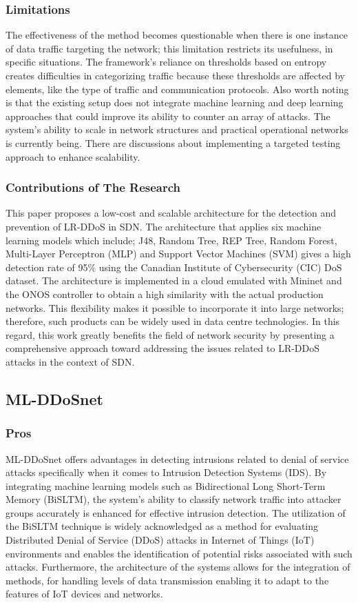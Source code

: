 \documentclass[a4paper, 12pt]{article}
\begin{document}
\subsubsection{Limitations}
The effectiveness of the method becomes questionable when there is one instance of data traffic targeting the network; this limitation restricts its usefulness, in specific situations. The framework's reliance on thresholds based on entropy creates difficulties in categorizing traffic because these thresholds are affected by elements, like the type of traffic and communication protocols. Also worth noting is that the existing setup does not integrate machine learning and deep learning approaches that could improve its ability to counter an array of attacks. The system's ability to scale in network structures and practical operational networks is currently being. There are discussions about implementing a targeted testing approach to enhance scalability. 

\subsubsection{Contributions of The Research}
This paper proposes a low-cost and scalable architecture for the detection and prevention of LR-DDoS in SDN. The architecture that applies six machine learning models which include; J48, Random Tree, REP Tree, Random Forest, Multi-Layer Perceptron (MLP) and Support Vector Machines (SVM) gives a high detection rate of 95\% using the Canadian Institute of Cybersecurity (CIC) DoS dataset. The architecture is implemented in a cloud emulated with Mininet and the ONOS controller to obtain a high similarity with the actual production networks. This flexibility makes it possible to incorporate it into large networks; therefore, such products can be widely used in data centre technologies. In this regard, this work greatly benefits the field of network security by presenting a comprehensive approach toward addressing the issues related to LR-DDoS attacks in the context of SDN. 

\subsection{ML-DDoSnet}
\subsubsection{Pros}
ML-DDoSnet offers advantages in detecting intrusions related to denial of service attacks specifically when it comes to Intrusion Detection Systems (IDS). By integrating machine learning models such as Bidirectional Long Short-Term Memory (BiSLTM), the system's ability to classify network traffic into attacker groups accurately is enhanced for effective intrusion detection. The utilization of the BiSLTM technique is widely acknowledged as a method for evaluating Distributed Denial of Service (DDoS) attacks in Internet of Things (IoT) environments and enables the identification of potential risks associated with such attacks. Furthermore, the architecture of the systems allows for the integration of methods, for handling levels of data transmission enabling it to adapt to the features of IoT devices and networks.
\end{document}
